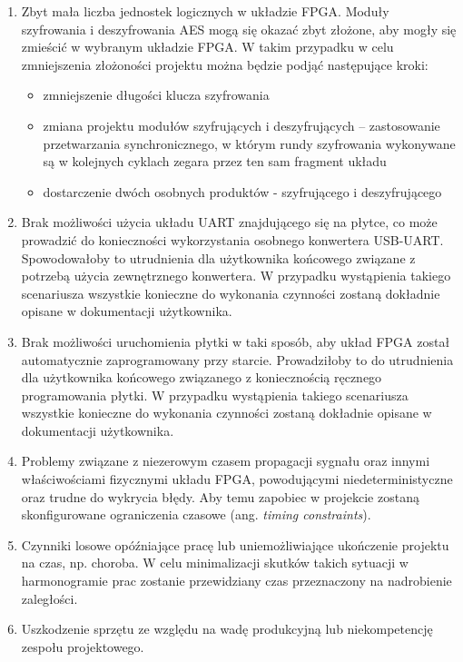 \begin{enumerate}
\item Zbyt mała liczba jednostek logicznych w układzie FPGA. Moduły szyfrowania i deszyfrowania AES mogą się okazać zbyt złożone, aby mogły się zmieścić w wybranym układzie FPGA. W takim przypadku w celu zmniejszenia złożoności projektu można będzie podjąć następujące kroki:
	\begin{itemize}
	\item zmniejszenie długości klucza szyfrowania
	\item zmiana projektu modułów szyfrujących i deszyfrujących -- zastosowanie przetwarzania synchronicznego, w którym rundy szyfrowania wykonywane są w kolejnych cyklach zegara przez ten sam fragment układu
	\item dostarczenie dwóch osobnych produktów - szyfrującego i deszyfrującego
	\end{itemize}
\item Brak możliwości użycia układu UART znajdującego się na płytce, co może prowadzić do konieczności wykorzystania osobnego konwertera USB-UART. Spowodowałoby to utrudnienia dla użytkownika końcowego związane z potrzebą użycia zewnętrznego konwertera. W przypadku wystąpienia takiego scenariusza wszystkie konieczne do wykonania czynności zostaną dokładnie opisane w dokumentacji użytkownika.
\item Brak możliwości uruchomienia płytki w taki sposób, aby układ FPGA został automatycznie zaprogramowany przy starcie. Prowadziłoby to do utrudnienia dla użytkownika końcowego związanego z koniecznością ręcznego programowania płytki. W przypadku wystąpienia takiego scenariusza wszystkie konieczne do wykonania czynności zostaną dokładnie opisane w dokumentacji użytkownika.
\item Problemy związane z niezerowym czasem propagacji sygnału oraz innymi właściwościami fizycznymi układu FPGA, powodującymi niedeterministyczne oraz trudne do wykrycia błędy. Aby temu zapobiec w projekcie zostaną skonfigurowane ograniczenia czasowe (ang. \textit{timing constraints}).
\item Czynniki losowe opóźniające pracę lub uniemożliwiające ukończenie projektu na czas, np. choroba. W celu minimalizacji skutków takich sytuacji w harmonogramie prac zostanie przewidziany czas przeznaczony na nadrobienie zaległości.
\item Uszkodzenie sprzętu ze względu na wadę produkcyjną lub niekompetencję zespołu projektowego.
\end{enumerate}


\newpage